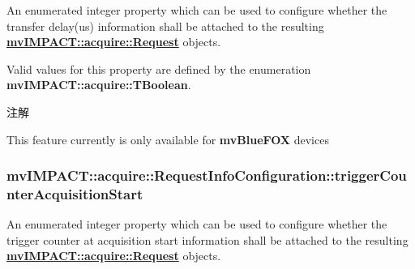 An enumerated integer property which can be used to configure whether the transfer delay(us) information shall be attached to the resulting {\bfseries \hyperlink{classmv_i_m_p_a_c_t_1_1acquire_1_1_request}{mv\+I\+M\+P\+A\+C\+T\+::acquire\+::\+Request}} objects. 

Valid values for this property are defined by the enumeration {\bfseries mv\+I\+M\+P\+A\+C\+T\+::acquire\+::\+T\+Boolean}. \begin{DoxyNote}{注解}

\begin{DoxyItemize}
\item This feature currently is only available for {\bfseries mv\+Blue\+F\+O\+X} devices 
\end{DoxyItemize}
\end{DoxyNote}
\hypertarget{classmv_i_m_p_a_c_t_1_1acquire_1_1_request_info_configuration_a97b843fd39a639b06422b0a13bfb7eb2}{
\subsubsection[{trigger\+Counter\+Acquisition\+Start}]{ mv\+I\+M\+P\+A\+C\+T\+::acquire\+::\+Request\+Info\+Configuration\+::trigger\+Counter\+Acquisition\+Start}}\label{classmv_i_m_p_a_c_t_1_1acquire_1_1_request_info_configuration_a97b843fd39a639b06422b0a13bfb7eb2}


An enumerated integer property which can be used to configure whether the trigger counter at acquisition start information shall be attached to the resulting {\bfseries \hyperlink{classmv_i_m_p_a_c_t_1_1acquire_1_1_request}{mv\+I\+M\+P\+A\+C\+T\+::acquire\+::\+Request}} objects. 

